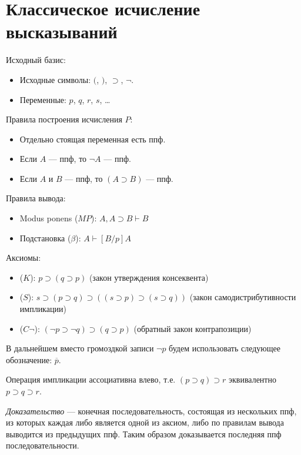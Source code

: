 \section{Классическое исчисление высказываний}

Исходный базис:
\begin{itemize}
    \item Исходные символы: $($, $)$, $\supset$, $\lnot$.
    \item Переменные: $p$, $q$, $r$, $s$, \dots
\end{itemize}

Правила построения исчисления $P$:
\begin{itemize}
    \item Отдельно стоящая переменная есть ппф.
    \item Если $A$ --- ппф, то $\lnot A$ --- ппф.
    \item Если $A$ и $B$ --- ппф, то $(A \supset B)$ --- ппф.
\end{itemize}

Правила вывода:
\begin{itemize}
    \item Modus ponens ($MP$): $A, A \supset B \vdash B$
    \item Подстановка ($\beta$): $A \vdash [B/p]A$
\end{itemize}

Аксиомы:
\begin{itemize}
    \item ($K$): $p \supset (q \supset p)$ (закон утверждения консеквента)
    \item ($S$): $s \supset (p \supset q) \supset ((s \supset p) \supset (s \supset q))$ (закон самодистрибутивности импликации)
    \item ($C\lnot$): $(\lnot p \supset \lnot q) \supset (q \supset p)$ (обратный закон контрапозиции)
\end{itemize}

В дальнейшем вместо громоздкой записи $\lnot p$ будем использовать следующее обозначение: $\overline{p}$.

Операция импликации ассоциативна влево, т.е. $(p \supset q) \supset r$ эквивалентно $p \supset q \supset r$.

\begin{definition}
    {\it Доказательство} --- конечная последовательность, состоящая из нескольких ппф, из которых каждая либо является одной из аксиом, либо по правилам вывода выводится из предыдущих ппф. Таким образом доказывается последняя ппф последовательности.
\end{definition}

